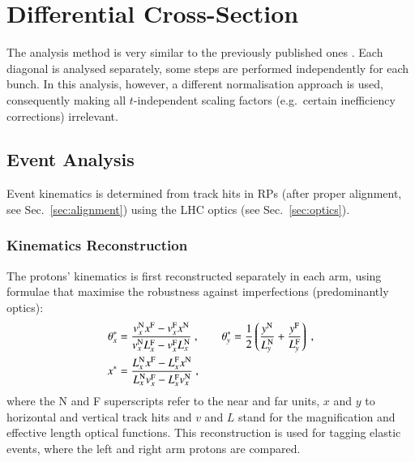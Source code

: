 \section{Differential Cross-Section}

The analysis method is very similar to the previously published ones \cite{epl101-el,prl111}. Each diagonal is analysed separately, some steps are performed independently for each bunch. In this analysis, however, a different normalisation approach is used, consequently making all $t$-independent scaling factors (e.g.~certain inefficiency corrections) irrelevant.

\subsection{Event Analysis}

Event kinematics is determined from track hits in RPs (after proper alignment, see Sec.~\ref{sec:alignment}) using the LHC optics (see Sec.~\ref{sec:optics}).


\subsubsection{Kinematics Reconstruction}
\label{sec:kinematics}

The protons' kinematics is first reconstructed separately in each arm, using formulae that maximise the robustness against imperfections (predominantly optics):
\begin{equation}
\label{eq:kin 1a}
	\begin{aligned}
		\theta_x^* &= {v_x^{\rm N} x^{\rm F} - v_x^{\rm F} x^{\rm N}\over v_x^{\rm N} L_x^{\rm F} - v_x^{\rm F} L_x^{\rm N}}\ ,\qquad
		\theta_y^* = {1\over 2} \left( {y^{\rm N}\over L_y^{\rm N}} + {y^{\rm F}\over L_y^{\rm F}} \right)\ ,\\
		x^* &= {L_x^{\rm N} x^{\rm F} - L_x^{\rm F} x^{\rm N}\over L_x^{\rm N} v_x^{\rm F} - L_x^{\rm F} v_x^{\rm N}}\ , \\
	\end{aligned}
\end{equation}
where the N and F superscripts refer to the near and far units, $x$ and $y$ to horizontal and vertical track hits and $v$ and $L$ stand for the magnification and effective length optical functions. This reconstruction is used for tagging elastic events, where the left and right arm protons are compared.


